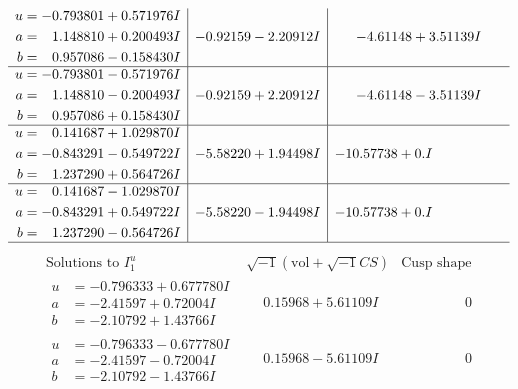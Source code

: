 \documentclass[1p]{elsarticle_modified}
\theoremstyle{definition}
\newcommand{\I}{\sqrt{-1}}
\begin{document}
$$\begin{array}{c|c|c}
\begin{aligned}
u &= -0.793801 + 0.571976 I \\
a &= \phantom{-}1.148810 + 0.200493 I \\
b &= \phantom{-}0.957086 - 0.158430 I\end{aligned}
 & -0.92159 - 2.20912 I & -4.61148 + 3.51139 I \\ \hline\begin{aligned}
u &= -0.793801 - 0.571976 I \\
a &= \phantom{-}1.148810 - 0.200493 I \\
b &= \phantom{-}0.957086 + 0.158430 I\end{aligned}
 & -0.92159 + 2.20912 I & -4.61148 - 3.51139 I \\ \hline\begin{aligned}
u &= \phantom{-}0.141687 + 1.029870 I \\
a &= -0.843291 - 0.549722 I \\
b &= \phantom{-}1.237290 + 0.564726 I\end{aligned}
 & -5.58220 + 1.94498 I & -10.57738 + 0. I\phantom{ +0.000000I} \\ \hline\begin{aligned}
u &= \phantom{-}0.141687 - 1.029870 I \\
a &= -0.843291 + 0.549722 I \\
b &= \phantom{-}1.237290 - 0.564726 I\end{aligned}
 & -5.58220 - 1.94498 I & -10.57738 + 0. I\phantom{ +0.000000I}\\
 \hline 
 \end{array}$$\newpage$$\begin{array}{c|c|c}  
\text{Solutions to }I^u_{1}& \I (\text{vol} + \sqrt{-1}CS) & \text{Cusp shape}\\
 \hline 
\begin{aligned}
u &= -0.796333 + 0.677780 I \\
a &= -2.41597 + 0.72004 I \\
b &= -2.10792 + 1.43766 I\end{aligned}
 & \phantom{-}0.15968 + 5.61109 I & \phantom{-0.000000 } 0 \\ \hline\begin{aligned}
u &= -0.796333 - 0.677780 I \\
a &= -2.41597 - 0.72004 I \\
b &= -2.10792 - 1.43766 I\end{aligned}
 & \phantom{-}0.15968 - 5.61109 I & \phantom{-0.000000 } 0 \\ \hline\begin{aligned}

\end{aligned}
\end{array}$$
\end{document}
